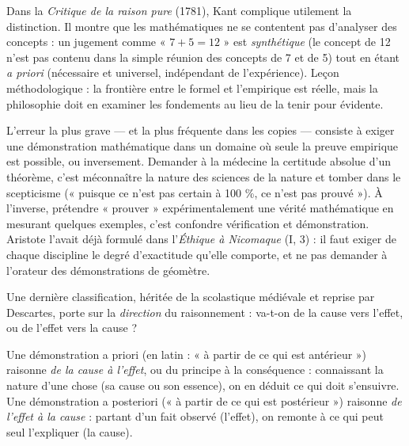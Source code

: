\documentclass[11pt]{article}
\newcommand{\cle}[1]{{\popxbold\color{popdark}#1}}
\newcounter{popsec}
\newcounter{popsub}
\newcommand{\courssub}[1]{%
  \stepcounter{popsub}%
  \par\vspace{9pt}\noindent{\popxbold\fontsize{11.5}{13}\selectfont\color{popink}{\color{poporange}\thepopsec.\thepopsub}\hspace{6pt}#1}\par\nopagebreak\vspace{4pt}
}
\begin{document}
\begin{propriete}
Dans la \emph{Critique de la raison pure} (1781), Kant complique utilement la distinction. Il montre que les mathématiques ne se contentent pas d'analyser des concepts : un jugement comme « $7 + 5 = 12$ » est \emph{synthétique} (le concept de 12 n'est pas contenu dans la simple réunion des concepts de 7 et de 5) tout en étant \emph{a priori} (nécessaire et universel, indépendant de l'expérience). Leçon méthodologique : la frontière entre le formel et l'empirique est réelle, mais la philosophie doit en examiner les fondements au lieu de la tenir pour évidente.
\end{propriete}

\begin{attention}
L'erreur la plus grave — et la plus fréquente dans les copies — consiste à exiger une démonstration mathématique dans un domaine où seule la preuve empirique est possible, ou inversement. Demander à la médecine la certitude absolue d'un théorème, c'est méconnaître la nature des sciences de la nature et tomber dans le scepticisme (« puisque ce n'est pas certain à 100 \%, ce n'est pas prouvé »). À l'inverse, prétendre « prouver » expérimentalement une vérité mathématique en mesurant quelques exemples, c'est confondre vérification et démonstration. Aristote l'avait déjà formulé dans l'\emph{Éthique à Nicomaque} (I, 3) : il faut exiger de chaque discipline le degré d'exactitude qu'elle comporte, et ne pas demander à l'orateur des démonstrations de géomètre.
\end{attention}

\courssub{Démonstrations a priori et a posteriori}

Une dernière classification, héritée de la scolastique médiévale et reprise par Descartes, porte sur la \emph{direction} du raisonnement : va-t-on de la cause vers l'effet, ou de l'effet vers la cause ?

\begin{definition}
Une démonstration \cle{a priori} (en latin : « à partir de ce qui est antérieur ») raisonne \emph{de la cause à l'effet}, ou du principe à la conséquence : connaissant la nature d'une chose (sa cause ou son essence), on en déduit ce qui doit s'ensuivre. Une démonstration \cle{a posteriori} (« à partir de ce qui est postérieur ») raisonne \emph{de l'effet à la cause} : partant d'un fait observé (l'effet), on remonte à ce qui peut seul l'expliquer (la cause).
\end{definition}
\end{document}
